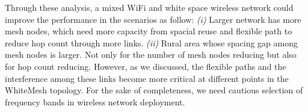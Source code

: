 Through these analysis, a mixed WiFi and white space wireless network could improve the performance 
in the scenarios as follow: 
{\it (i)} Larger network has more mesh nodes, which 
need more capacity from spacial reuse and flexible path to reduce hop count through
more links. 
{\it (ii)} Rural area whose spacing gap among mesh nodes is larger.
Not only for the number of mesh nodes reducing but also for hop count reducing.
However, as we discussed, the flexible paths and the interference among these
links become more critical at different points in the WhiteMesh topology. 
For the sake of completeness, we need cautious selection of frequency bands
in wireless network deployment.

